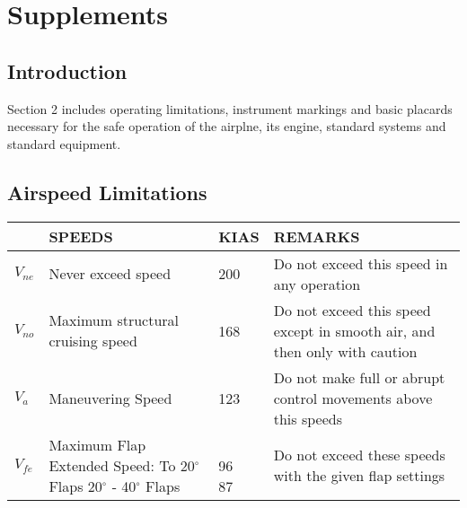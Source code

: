 \chapter{Supplements}
\thispagestyle{fancy}
\minitoc[n] %

\section{Introduction}
Section 2 includes operating limitations, instrument markings and basic placards necessary for the safe operation of the airplne, its engine, standard systems and standard equipment.

\section{Airspeed Limitations}


\begin{center}
\begin{tabular}{ |p{1cm}|p{6cm}|p{2cm}|p{5cm}| } 
 \hline
  & SPEEDS &  KIAS & REMARKS\\ 
 \hline
 $V_{ne}$ & Never exceed speed & 200 & Do not exceed this speed in any operation\\ 
 \hline
 $V_{no}$ & Maximum structural cruising speed & 168  & Do not exceed this speed except in smooth air, and then only with caution\\ 
 \hline
 $V_{a}$ & Maneuvering Speed & 123  & Do not make full or abrupt control movements above this speeds \\ 
 \hline
 $V_{fe}$  & \shortstack[l]{Maximum Flap Extended Speed: \\To 20$^{\circ}$ Flaps\\ 20$^{\circ}$ - 40$^{\circ}$ Flaps} & \shortstack[l]{\\96 \\ 87} & Do not exceed these speeds with the given flap settings \\ 
 \hline
\end{tabular}
\end{center}


